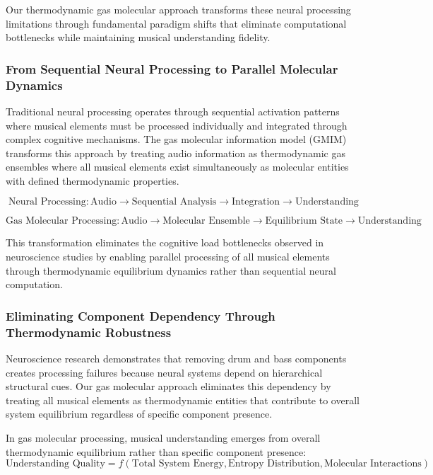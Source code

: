 Our thermodynamic gas molecular approach transforms these neural processing limitations through fundamental paradigm shifts that eliminate computational bottlenecks while maintaining musical understanding fidelity.

\subsubsection{From Sequential Neural Processing to Parallel Molecular Dynamics}

Traditional neural processing operates through sequential activation patterns where musical elements must be processed individually and integrated through complex cognitive mechanisms. The gas molecular information model (GMIM) transforms this approach by treating audio information as thermodynamic gas ensembles where all musical elements exist simultaneously as molecular entities with defined thermodynamic properties.

\begin{equation}
\text{Neural Processing}: \text{Audio} \rightarrow \text{Sequential Analysis} \rightarrow \text{Integration} \rightarrow \text{Understanding}
\end{equation}

\begin{equation}
\text{Gas Molecular Processing}: \text{Audio} \rightarrow \text{Molecular Ensemble} \rightarrow \text{Equilibrium State} \rightarrow \text{Understanding}
\end{equation}

This transformation eliminates the cognitive load bottlenecks observed in neuroscience studies by enabling parallel processing of all musical elements through thermodynamic equilibrium dynamics rather than sequential neural computation.

\subsubsection{Eliminating Component Dependency Through Thermodynamic Robustness}

Neuroscience research demonstrates that removing drum and bass components creates processing failures because neural systems depend on hierarchical structural cues. Our gas molecular approach eliminates this dependency by treating all musical elements as thermodynamic entities that contribute to overall system equilibrium regardless of specific component presence.

\begin{definition}
In gas molecular processing, musical understanding emerges from overall thermodynamic equilibrium rather than specific component presence:
\begin{equation}
\text{Understanding Quality} = f(\text{Total System Energy}, \text{Entropy Distribution}, \text{Molecular Interactions})
\end{equation}
\end{definition}

